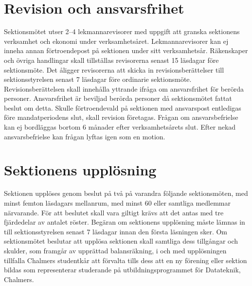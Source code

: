\documentclass[a4paper]{dteklag}
\begin{document}
\section{Revision och ansvarsfrihet}
\para[Revisorer] Sektionsmötet utser 2–4 lekmannarevisorer med uppgift att granska sektionens verksamhet och ekonomi under verksamhetsåret.
\stycke Lekmannarevisorer kan ej inneha annan förtroendepost på sektionen under sitt verksamhetsår.
\stycke Räkenskaper och övriga handlingar skall tillställas revisorerna senast 15 läsdagar före sektionsmöte.
\para Det åligger revisorerna att skicka in revisionsberättelser till sektionsstyrelsen senast 7 läsdagar före ordinarie sektionsmöte.
\stycke Revisionsberättelsen skall innehålla yttrande ifråga om ansvarsfrihet för berörda personer.
\para[Ansvarsfrihet] Ansvarsfrihet är beviljad berörda personer då sektionsmötet fattat beslut om detta.
\stycke Skulle förtroendevald på sektionen med ansvarspost entledigas före mandatperiodens slut, skall revision företagas.
\para Frågan om ansvarsbefrielse kan ej bordläggas bortom 6 månader efter verksamhetsårets slut.
\para Efter nekad ansvarsbefrielse kan frågan lyftas igen som en motion.

\section{Sektionens upplösning}
\para Sektionen upplöses genom beslut på två på varandra följande sektionsmöten, med minst femton läsdagars mellanrum, med minst 60 eller samtliga medlemmar närvarande.
\stycke För att beslutet skall vara giltigt krävs att det antas med tre fjärdedelar av antalet röster.
\para Begäran om sektionens upplösning måste lämnas in till sektionsstyrelsen senast 7 läsdagar innan den första läsningen sker.
\para Om sektionsmötet beslutar att upplösa sektionen skall samtliga dess tillgångar och skulder, som framgår av upprättad balansräkning, i och med upplösningen tillfalla Chalmers studentkår att förvalta tills dess att en ny förening eller sektion bildas som representerar studerande på utbildningsprogrammet för Datateknik, Chalmers.
\end{document}
